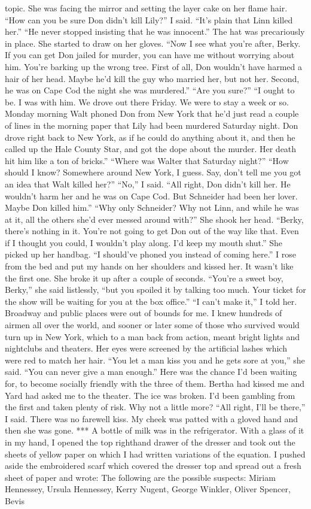 \documentclass{novel}
\begin{document}
topic. She was facing the mirror and setting the layer cake on her flame hair. “How can you be sure Don didn’t kill Lily?” I said. “It’s plain that Linn killed her.” “He never stopped insisting that he was innocent.” The hat was precariously in place. She started to draw on her gloves. “Now I see what you’re after, Berky. If you can get Don jailed for murder, you can have me without worrying about him. You’re barking up the wrong tree. First of all, Don wouldn’t have harmed a hair of her head. Maybe he’d kill the guy who married her, but not her. Second, he was on Cape Cod the night she was murdered.” “Are you sure?” “I ought to be. I was with him. We drove out there Friday. We were to stay a week or so. Monday morning Walt phoned Don from New York that he’d just read a couple of lines in the morning paper that Lily had been murdered Saturday night. Don drove right back to New York, as if he could do anything about it, and then he called up the Hale County Star, and got the dope about the murder. Her death hit him like a ton of bricks.” “Where was Walter that Saturday night?” “How should I know? Somewhere around New York, I guess. Say, don’t tell me you got an idea that Walt killed her?” “No,” I said. “All right, Don didn’t kill her. He wouldn’t harm her and he was on Cape Cod. But Schneider had been her lover. Maybe Don killed him.” “Why only Schneider? Why not Linn, and while he was at it, all the others she’d ever messed around with?” She shook her head. “Berky, there’s nothing in it. You’re not going to get Don out of the way like that. Even if I thought you could, I wouldn’t play along. I’d keep my mouth shut.” She picked up her handbag. “I should’ve phoned you instead of coming here.” I rose from the bed and put my hands on her shoulders and kissed her. It wasn’t like the first one. She broke it up after a couple of seconds. “You’re a sweet boy, Berky,” she said listlessly, “but you spoiled it by talking too much. Your ticket for the show will be waiting for you at the box office.” “I can’t make it,” I told her. Broadway and public places were out of bounds for me. I knew hundreds of airmen all over the world, and sooner or later some of those who survived would turn up in New York, which to a man back from action, meant bright lights and nightclubs and theaters. Her eyes were screened by the artificial lashes which were red to match her hair. “You let a man kiss you and he gets sore at you,” she said. “You can never give a man enough.” Here was the chance I’d been waiting for, to become socially friendly with the three of them. Bertha had kissed me and Yard had asked me to the theater. The ice was broken. I’d been gambling from the first and taken plenty of risk. Why not a little more? “All right, I’ll be there,” I said. There was no farewell kiss. My cheek was patted with a gloved hand and then she was gone. *** A bottle of milk was in the refrigerator. With a glass of it in my hand, I opened the top righthand drawer of the dresser and took out the sheets of yellow paper on which I had written variations of the equation. I pushed aside the embroidered scarf which covered the dresser top and spread out a fresh sheet of paper and wrote: The following are the possible suspects: Miriam Hennessey, Ursula Hennessey, Kerry Nugent, George Winkler, Oliver Spencer, Bevis 
\end{document}
